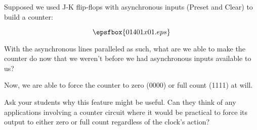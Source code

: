 

Supposed we used J-K flip-flops with asynchronous inputs (Preset and Clear) to build a counter:

$$\epsfbox{01401x01.eps}$$

With the asynchronous lines paralleled as such, what are we able to make the counter do now that we weren't before we had asynchronous inputs available to us?







Now, we are able to force the counter to zero (0000) or full count (1111) at will.







Ask your students why this feature might be useful.  Can they think of any applications involving a counter circuit where it would be practical to force its output to either zero or full count regardless of the clock's action?





